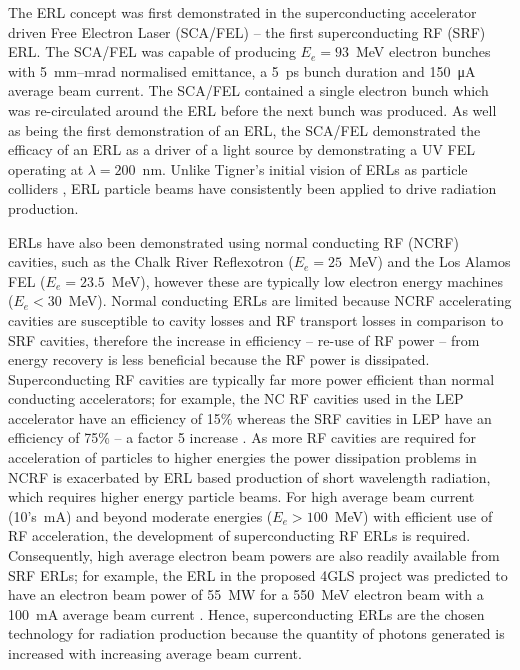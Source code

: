 \documentclass[../main.tex]{subfiles}
\begin{document}
The ERL concept was first demonstrated in the superconducting accelerator driven Free Electron Laser (SCA/FEL) \cite{smith1987development} -- the first superconducting RF (SRF) ERL. The SCA/FEL was capable of producing $E_{e} = 93$~\si{\mega\electronvolt} electron bunches with 5~\si{\milli\meter}--\si{\milli\radian} normalised emittance, a 5~\si{\pico\second} bunch duration and 150~\si{\micro\ampere} average beam current. The SCA/FEL contained a single electron bunch which was re-circulated around the ERL before the next bunch was produced. As well as being the first demonstration of an ERL, the SCA/FEL demonstrated the efficacy of an ERL as a driver of a light source by demonstrating a UV FEL operating at $\lambda = 200$~\si{\nano\meter}. Unlike Tigner's initial vision of ERLs as particle colliders \cite{tigner1965possible}, ERL particle beams have consistently been applied to drive radiation production.

ERLs have also been demonstrated using normal conducting RF (NCRF) cavities, such as the Chalk River Reflexotron ($E_{e} = 25$~\si{\mega\electronvolt}) \cite{schriber1977experimental} and the Los Alamos FEL ($E_{e} = 23.5$~\si{\mega\electronvolt})\cite{feldman1987energy}, however these are typically low electron energy machines ($E_{e} < 30$~\si{\mega\electronvolt}). Normal conducting ERLs are limited because NCRF accelerating cavities are susceptible to cavity losses and RF transport losses \cite{adolphsen2022european} in comparison to SRF cavities, therefore the increase in efficiency -- re-use of RF power -- from energy recovery is less beneficial because the RF power is dissipated. Superconducting RF cavities are typically far more power efficient than normal conducting accelerators; for example, the NC RF cavities used in the LEP accelerator have an efficiency of 15\% whereas the SRF cavities in LEP have an efficiency of 75\% -- a factor 5 increase \cite{weingarten1996superconducting}. As more RF cavities are required for acceleration of particles to higher energies the power dissipation problems in NCRF is exacerbated by ERL based production of short wavelength radiation, which requires higher energy particle beams. For high average beam current (10's~\si{\milli\ampere}) and beyond moderate energies ($E_{e} > 100$~\si{\mega\electronvolt}) with efficient use of RF acceleration, the development of superconducting RF ERLs is required. Consequently, high average electron beam powers are also readily available from SRF ERLs; for example, the ERL in the proposed 4GLS project \cite{poole20034gls} was predicted to have an electron beam power of 55~\si{\mega\watt} for a 550~\si{\mega\electronvolt} electron beam with a 100~\si{\milli\ampere} average beam current \cite{williams2007electron}. Hence, superconducting ERLs are the chosen technology for radiation production because the quantity of photons generated is increased with increasing average beam current. 
\end{document}
